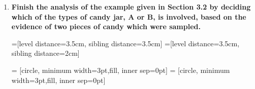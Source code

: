 \documentclass[10pt, oneside]{article}
\begin{document}
\begin{enumerate}[label=3.\arabic*]
	\begin{enumerate}
	\item  \begin{tcolorbox}[
	  colback=Cerulean!5!white,
	  colframe=Cerulean!75!black]
	\textbf{$\bm{P(A \text{ fails } | B \text{ has failed})}$,}
	\end{tcolorbox}
	
	Observe that $P(B \text{ fails}) = P(B \text{ fails alone or } A \text{ and } B \text{ fail})$. Then this gives us $P(B \text{ fails alone}) + P(A \text{ and } B \text{ fail}) - P(B \text{ fails alone and } A \text{ and } B \text{ fail}) = 0.15 + 0.15 = 0.30$. Then $P(A \text{ fails } | B \text{ has failed}) = \frac{P(A \text{ fails } \cap B \text{ has failed})}{P(B \text{ fails})} = \frac{0.15}{0.30} = \boxed{0.5}$.
	
	\item  \begin{tcolorbox}[
	  colback=Cerulean!5!white,
	  colframe=Cerulean!75!black]
	\textbf{$\bm{P(A \text{ fails alone})}$.}
	\end{tcolorbox}
	
	Observe that $P(A \text{ fails}) = P(A \text{ fails alone}) + P(A \text{ and } B \text{ fail}) - P(A \text{ fails alone and } A \text{ and } B \text{ fail})$. Then $P(A \text{ fails alone}) = P(A \text{ fails}) - P(A \text{ and } B \text{ fail}) = 0.20 - 0.15 = \boxed{0.05}$.
	\end{enumerate}

\newpage
\item  \begin{tcolorbox}[
  colback=Cerulean!5!white,
  colframe=Cerulean!75!black]
\textbf{Finish the analysis of the example given in Section 3.2 by deciding which of the types of candy jar, $\bm{A}$ or $\bm{B}$, is involved, based on the evidence of two pieces of candy which were sampled.}
\end{tcolorbox}

=[level distance=3.5cm, sibling distance=3.5cm]
=[level distance=3.5cm, sibling distance=2cm]

 = [circle, minimum width=3pt,fill, inner sep=0pt]
 = [circle, minimum width=3pt,fill, inner sep=0pt]


\end{enumerate}
\end{document}
